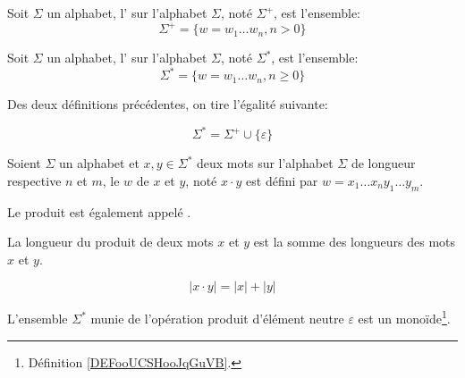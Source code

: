 \begin{definition}
	Soit \( \Sigma \) un alphabet, l' sur l'alphabet \( \Sigma \), noté \( \Sigma^+ \), est l'ensemble:
	\begin{equation}
		\Sigma^+ = \{ w = w_1 \ldots w_n, n > 0 \}
	\end{equation}
\end{definition}

\begin{definition}
	Soit \( \Sigma \) un alphabet, l' sur l'alphabet \( \Sigma \), noté \( \Sigma^* \), est l'ensemble:
	\begin{equation}
		\Sigma^* = \{ w = w_1 \ldots w_n, n \geq 0 \}
	\end{equation}
\end{definition}

Des deux définitions précédentes, on tire l'égalité suivante:

\begin{equation}
	\Sigma^* = \Sigma^+ \cup \{ \varepsilon \}
\end{equation}

\begin{definition}
	Soient \( \Sigma \) un alphabet et \( x, y \in \Sigma^* \) deux mots sur l'alphabet \( \Sigma \) de longueur respective \( n \) et \( m \), le  \( w \) de \( x \) et \( y \), noté \( x \cdot y \) est défini par \( w = x_1 \ldots x_n y_1 \ldots y_m \).
\end{definition}

Le produit est également appelé .

\begin{proposition}

	La longueur du produit de deux mots \( x \) et \( y \) est la somme des longueurs des mots \( x \) et \( y \).

	\begin{equation}
		|x \cdot y| = |x| + |y|
	\end{equation}
\end{proposition}


\begin{proposition}
	L'ensemble \( \Sigma^* \) munie de l'opération produit d'élément neutre \( \varepsilon \) est un monoïde\footnote{Définition \ref{DEFooUCSHooJqGuVB}.}.
\end{proposition}

